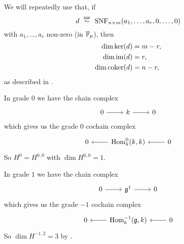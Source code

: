 \begin{remark}
  We will repeatedly use that, if
  \begin{equation*}
    d \snfsim \SNF_{n \times m}(a_{1},\dotsc,a_{r},0,\dotsc,0)
  \end{equation*}
  with $a_{1},\dotsc,a_{r}$ non-zero (in $\mathbb{F}_{p}$), then
  \begin{align*}
    \dim \operatorname{ker}(d) &= m-r, \\
    \dim \operatorname{im}(d) &= r, \\
    \dim \operatorname{coker}(d) &= n-r,
  \end{align*}
  as described in .
\end{remark}

In grade $0$ we have the chain complex
\[
  \begin{tikzcd}
    0 \ar[r] & k \ar[r] & 0
  \end{tikzcd}
\]
which gives us the grade $0$ cochain complex
\[
  \begin{tikzcd}
    0 & \ar[l] \Hom_{k}^{0}(k,k) & \ar[l] 0
  \end{tikzcd}
\]
So $H^{0} = H^{0,0}$ with $\dim H^{0,0} = 1$.

In grade $1$ we have the chain complex
\[
  \begin{tikzcd}
    0 \ar[r] & \lie{g}^{1} \ar[r] & 0
  \end{tikzcd}
\]
which gives us the grade $-1$ cochain complex
\[
  \begin{tikzcd}
    0 & \ar[l] \Hom_{k}^{-1}(\lie{g},k) & \ar[l] 0
  \end{tikzcd}
\]
So $\dim H^{-1,2} = 3$ by .

